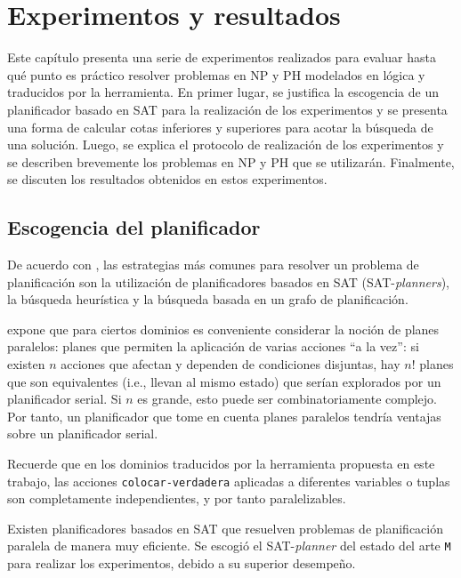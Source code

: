 \chapter{Experimentos y resultados}
\label{Chapter4}

Este capítulo presenta una serie de experimentos realizados para evaluar hasta
qué punto es práctico resolver problemas en NP y PH modelados en lógica y
traducidos por la herramienta.
En primer lugar, se justifica la escogencia de un planificador basado en SAT
para la realización de los experimentos y se presenta una forma de calcular
cotas inferiores y superiores para acotar la búsqueda de una solución. Luego,
se explica el protocolo de realización de los experimentos y se describen brevemente 
los problemas en NP y PH que se utilizarán. Finalmente, se discuten los resultados
obtenidos en estos experimentos.

\section{Escogencia del planificador}
De acuerdo con \cite{russell:book}, las estrategias más comunes para resolver
un problema de planificación son la utilización de planificadores basados en
SAT (SAT-\textit{planners}), la búsqueda heurística y la búsqueda basada en un
grafo de planificación.

\cite{rintanen:notes} expone que para ciertos dominios es conveniente
considerar la noción de planes paralelos: planes que permiten la aplicación de
varias acciones ``a la vez'': si existen $n$ acciones que afectan y dependen de
condiciones disjuntas, hay $n!$ planes que son equivalentes (i.e., llevan al
mismo estado) que serían explorados por un planificador serial. Si $n$ es
grande, esto puede ser combinatoriamente complejo. Por tanto, un planificador
que tome en cuenta planes paralelos tendría ventajas sobre un planificador
serial.

Recuerde que en los dominios traducidos por la herramienta propuesta en este
trabajo, las acciones \texttt{colocar-verdadera}
aplicadas a diferentes variables o tuplas son completamente independientes, y
por tanto paralelizables.

Existen planificadores basados en SAT que resuelven problemas de
planificación paralela de manera muy eficiente. Se escogió el
SAT-\textit{planner} del
estado del arte \texttt{M} \citep{rintanen:m2010} para realizar los experimentos, 
debido a su superior desempeño.

